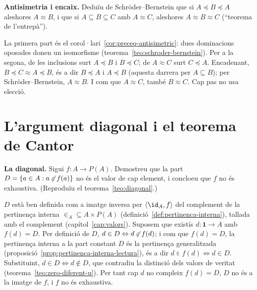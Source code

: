 \begin{exercici}
\textbf{Antisimetria i encaix.} Deduïu de Schröder--Bernstein que si \(A\preceq B\preceq A\) aleshores \(A\approx B\), i que si \(A\subseteq B\subseteq C\) amb \(A\approx C\), aleshores \(A\approx B\approx C\) (\enquote{teorema de l'entrepà}).
\end{exercici}
\begin{solucio}
La primera part és el corol·lari~\ref{cor:preceq-antisimetric}: dues dominacions oposades donen un isomorfisme (teorema~\ref{teo:schroder-bernstein}). Per a la segona, de les inclusions surt \(A\preceq B\) i \(B\preceq C\); de \(A\approx C\) surt \(C\preceq A\). Encadenant, \(B\preceq C\approx A\preceq B\), és a dir \(B\preceq A\) i \(A\preceq B\) (aquesta darrera per \(A\subseteq B\)); per Schröder--Bernstein, \(A\approx B\). I com que \(A\approx C\), també \(B\approx C\). Cap pas no usa elecció.
\end{solucio}

\section{L'argument diagonal i el teorema de Cantor}\label{prac:cantor}

\begin{exercici}
\textbf{La diagonal.} Sigui \(f\colon A\to P(A)\). Demostreu que la part \(D=\{a\in A : a\not\mathrel{\varepsilon} f(a)\}\) no és el valor de cap element, i concloeu que \(f\) no és exhaustiva. (Reproduïu el teorema~\ref{teo:diagonal}.)
\end{exercici}
\begin{solucio}
\(D\) està ben definida com a imatge inversa per \(\langle\id_A,f\rangle\) del complement de la pertinença interna \({\in_A}\subseteq A\times P(A)\) (definició~\ref{def:pertinenca-interna}), tallada amb el complement (capítol~\ref{cap:valors}). Suposem que existís \(d\colon\mathbf1\to A\) amb \(f(d)=D\). Per definició de \(D\), \(d\in D\Leftrightarrow d\not\mathrel{\varepsilon} f(d)\); i com que \(f(d)=D\), la pertinença interna a la part constant \(D\) és la pertinença generalitzada (proposició~\ref{prop:pertinenca-interna-lectura}), és a dir \(d\mathrel{\varepsilon} f(d)\Leftrightarrow d\in D\). Substituint, \(d\in D\Leftrightarrow d\notin D\), que contradiu la distinció dels valors de veritat (teorema~\ref{teo:zero-diferent-u}). Per tant cap \(d\) no compleix \(f(d)=D\), \(D\) no és a la imatge de \(f\), i \(f\) no és exhaustiva.
\end{solucio}

